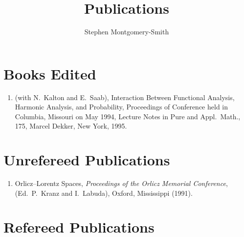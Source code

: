 \documentclass{article}
\newcommand{\littlesection}[1]{\section*{\normalsize\bf #1}}
\begin{document}
\title{Publications}
\author{Stephen Montgomery-Smith}
\maketitle

\littlesection{Books Edited}

\begin{enumerate}
\item (with N.~Kalton and E.~Saab), Interaction Between Functional
Analysis, Harmonic Analysis, and Probability, Proceedings of Conference
held in Columbia, Missouri on May 1994, Lecture Notes in Pure and
Appl.\ Math., 175, Marcel Dekker, New York, 1995.
\end{enumerate}

\littlesection{Unrefereed Publications}

\begin{enumerate}
\item Orlicz--Lorentz Spaces, {\em Proceedings of the Orlicz
Memorial Conference}, (Ed.\ P.~Kranz and I.~Labuda), Oxford, Mississippi
(1991).
\end{enumerate}

\littlesection{Refereed Publications}
\end{document}
